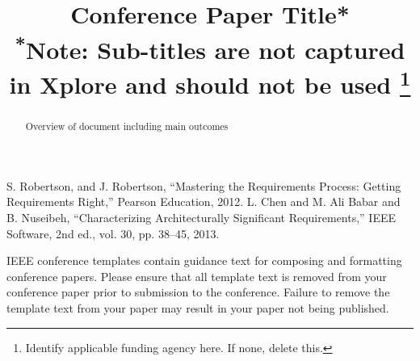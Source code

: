 \documentclass[conference]{IEEEtran}
\begin{document}
\title{Conference Paper Title*\\
{\footnotesize \textsuperscript{*}Note: Sub-titles are not captured in Xplore and
should not be used}
\thanks{Identify applicable funding agency here. If none, delete this.}
}

\author{
\and
{}
\and
{}
\and
{}
}

\maketitle

\begin{abstract}
Overview of document including main outcomes
\end{abstract}
















\begin{thebibliography}{00}
 S. Robertson, and J. Robertson, ``Mastering the Requirements Process: Getting Requirements Right,'' Pearson Education, 2012.
 L. Chen and M. Ali Babar and B. Nuseibeh, ``Characterizing Architecturally Significant Requirements,'' IEEE Software, 2nd ed., vol. 30, pp. 38--45, 2013.
\end{thebibliography}
\vspace{12pt}
\color{red}
IEEE conference templates contain guidance text for composing and formatting conference papers. Please ensure that all template text is removed from your conference paper prior to submission to the conference. Failure to remove the template text from your paper may result in your paper not being published.
\end{document}
